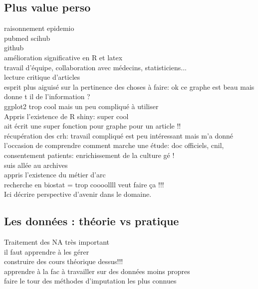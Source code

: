 \documentclass{book}
\begin{document}
\subsection{Plus value perso}
raisonnement epidemio\\
pubmed scihub\\
github\\
amélioration significative en R et latex \\
travail d'équipe, collaboration avec médecins, statisticiens...\\
lecture critique d'articles\\
esprit plus aiguisé sur la pertinence des choses à faire: ok ce graphe est beau mais donne t il de l'information ?\\
ggplot2 trop cool mais un peu compliqué à utiliser\\
Appris l'existence de R shiny: super cool \\
ait écrit une super fonction pour graphe pour un article !! \\
récupération des crh: travail compliqué est peu intéressant mais m'a donné l'occasion de comprendre comment marche une étude: doc officiels, cnil, consentement patients: enrichissement de la culture gé !\\
suis allée au archives\\
appris l'existence du métier d'arc\\
recherche en biostat = trop coooollll veut faire ça !!!\\
Ici décrire perspective d'avenir dans le domaine.\\

\subsection{Les données : théorie vs pratique}
Traitement des NA très important\\
il faut apprendre à les gérer\\
construire des cours théorique dessus!!!\\
apprendre à la fac à travailler sur des données moins propres\\
faire le tour des méthodes d'imputation les plus connues\\
\end{document}
